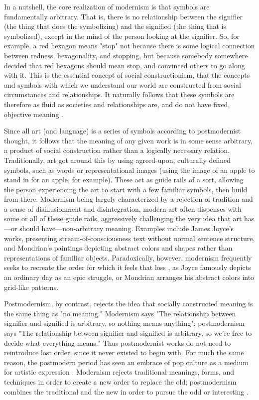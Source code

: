 In a nutshell, the core realization of modernism is that symbols are fundamentally arbitrary. That is, there is no relationship between the signifier (the thing that does the symbolizing) and the signified (the thing that is symbolized), except in the mind of the person looking at the signifier. So, for example, a red hexagon means "stop" not because there is some logical connection between redness, hexagonality, and stopping, but because somebody somewhere decided that red hexagons should mean stop, and convinced others to go along with it. This is the essential concept of social constructionism, that the concepts and symbols with which we understand our world are constructed from social circumstances and relationships. It naturally follows that these symbols are therefore as fluid as societies and relationships are, and do not have fixed, objective meaning \cite{ref3}. 

Since all art (and language) is a series of symbols according to postmodernist thought, it follows that the meaning of any given work is in some sense arbitrary, a product of social construction rather than a logically necessary relation. Traditionally, art got around this by using agreed-upon, culturally defined symbols, such as words or representational images (using the image of an apple to stand in for an apple, for example). These act as guide rails of a sort, allowing the person experiencing the art to start with a few familiar symbols, then build from there. Modernism being largely characterized by a rejection of tradition and a sense of disillusionment and disintegration, modern art often dispenses with some or all of these guide rails, aggressively challenging the very idea that art has—or should have—non-arbitrary meaning. Examples include James Joyce's works, presenting stream-of-consciousness text without normal sentence structure, and Mondrian's paintings depicting abstract colors and shapes rather than representations of familiar objects. Paradoxically, however, modernism frequently seeks to recreate the order for which it feels that loss \cite{ref4}, as Joyce famously depicts an ordinary day as an epic struggle, or Mondrian arranges his abstract colors into grid-like patterns.

Postmodernism, by contrast, rejects the idea that socially constructed meaning is the same thing as "no meaning." Modernism says "The relationship between signifier and signified is arbitrary, so nothing means anything"; postmodernism says "The relationship between signifier and signified is arbitrary, so we're free to decide what everything means." Thus postmodernist works do not need to reintroduce lost order, since it never existed to begin with. For much the same reason, the postmodern period has seen an embrace of pop culture as a medium for artistic expression \cite{ref5}. Modernism rejects traditional meanings, forms, and techniques in order to create a new order to replace the old; postmodernism combines the traditional and the new in order to pursue the odd or interesting \cite{ref6}. 

